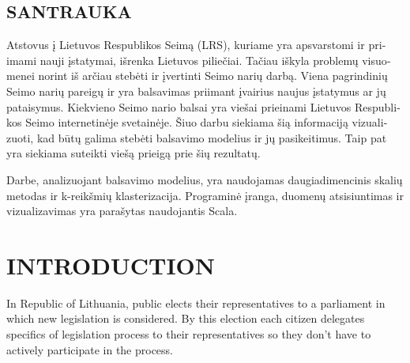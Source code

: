 \documentclass[a4paper,12pt]{article}
\begin{document}
    \clearpage
    
    \begin{center}
    	\section*{SANTRAUKA}
    \end{center}
    
    
    \begin{otherlanguage}{lithuanian}
    	Atstovus į Lietuvos Respublikos Seimą (LRS), kuriame yra apsvarstomi ir priimami nauji įstatymai, išrenka Lietuvos piliečiai. Tačiau iškyla problemų visuomenei norint iš arčiau stebėti ir įvertinti Seimo narių darbą. Viena pagrindinių Seimo narių pareigų ir yra balsavimas priimant įvairius naujus įstatymus ar jų pataisymus. Kiekvieno Seimo nario balsai yra viešai prieinami Lietuvos Respublikos Seimo internetinėje svetainėje. Šiuo darbu siekiama šią informaciją vizualizuoti, kad būtų galima stebėti balsavimo modelius ir jų pasikeitimus. Taip pat yra siekiama suteikti viešą prieigą prie šių rezultatų.
    	
    	Darbe, analizuojant balsavimo modelius, yra naudojamas daugiadimencinis skalių metodas ir k-reikšmių klasterizacija. Programinė įranga, duomenų atsisiuntimas ir vizualizavimas yra parašytas naudojantis Scala.
    	
    \end{otherlanguage}

	\clearpage
	
	\begingroup
	\singlespacing
	\tableofcontents
	\endgroup
    
    \clearpage
    
    \printglossary[type=\acronymtype,title={ACRONYMS}]
    
    \clearpage
    
    \printglossary[title={GLOSSARY}]
    
    \clearpage
    
    
    \section{INTRODUCTION}
    
    In Republic of Lithuania, public elects their representatives to a parliament in which new legislation is considered. By this election each citizen delegates specifics of legislation process to their representatives so they don't have to actively participate in the process.
	
\end{document}
